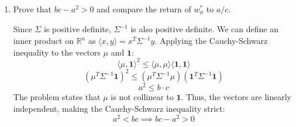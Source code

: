 \begin{enumerate}
            The variance $V_{\phi}$ is given by $(w_{\phi}^{*})^{T}\Sigma w_{\phi}^{*}$. We use the expanded form of $w_{\phi}^{*}$:
            \begin{align*}
                  V_{\phi} & = \left( \frac{1}{\phi}\mu^{T}\Sigma^{-1} - \frac{a - \phi}{\phi c}\mathbf{1}^{T}\Sigma^{-1} \right) \Sigma \left( \frac{1}{\phi}\Sigma^{-1}\mu - \frac{a - \phi}{\phi c}\Sigma^{-1}\mathbf{1} \right)                                   \\
                           & = \left( \frac{1}{\phi}\mu^{T} - \frac{a - \phi}{\phi c}\mathbf{1}^{T} \right) \left( \frac{1}{\phi}\Sigma^{-1}\mu - \frac{a - \phi}{\phi c}\Sigma^{-1}\mathbf{1} \right)                                                                \\
                           & = \frac{1}{\phi^{2}}\mu^{T}\Sigma^{-1}\mu - \frac{a - \phi}{\phi^{2} c}\mu^{T}\Sigma^{-1}\mathbf{1} - \frac{a - \phi}{\phi^{2} c}\mathbf{1}^{T}\Sigma^{-1}\mu + \frac{(a - \phi)^{2}}{\phi^{2} c^{2}}\mathbf{1}^{T}\Sigma^{-1}\mathbf{1} \\
                           & = \frac{b}{\phi^{2}} - \frac{a(a - \phi)}{\phi^{2} c} - \frac{a(a - \phi)}{\phi^{2} c} + \frac{(a - \phi)^{2}}{\phi^{2} c^{2}} c                                                                                                         \\
                           & = \frac{bc - 2a^{2} + 2a\phi + a^{2} - 2a\phi + \phi^{2}}{\phi^{2} c}                                                                                                                                                                    \\
                           & = \frac{bc - a^{2} + \phi^{2}}{\phi^{2} c} = \frac{bc - a^{2}}{\phi^{2} c} + \frac{1}{c}
            \end{align*}

      \item Prove that $bc-a^{2}>0$ and compare the return of $w_{\phi}^{*}$ to $a/c$.

            Since $\Sigma$ is positive definite, $\Sigma^{-1}$ is also positive definite. We can define an inner product on $\mathbb{R}^{n}$ as $\langle x, y \rangle = x^{T}\Sigma^{-1}y$.
            Applying the Cauchy-Schwarz inequality to the vectors $\mu$ and $\mathbf{1}$:
            \[ \langle \mu, \mathbf{1} \rangle^{2} \le \langle \mu, \mu \rangle \langle \mathbf{1}, \mathbf{1} \rangle \]
            \[ (\mu^{T}\Sigma^{-1}\mathbf{1})^{2} \le (\mu^{T}\Sigma^{-1}\mu)(\mathbf{1}^{T}\Sigma^{-1}\mathbf{1}) \]
            \[ a^{2} \le b \cdot c \]
            The problem states that $\mu$ is not collinear to $\mathbf{1}$. Thus, the vectors are linearly independent, making the Cauchy-Schwarz inequality strict:
            \[ a^{2} < bc \implies bc - a^{2} > 0 \]


\end{enumerate}
